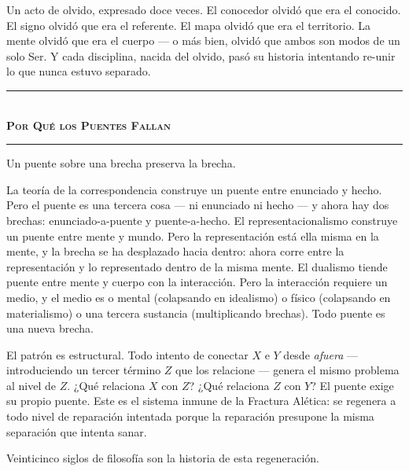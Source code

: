 \documentclass[10pt, openany, oneside]{book}
\renewcommand{\normalsize}{\fontsize{10}{13}\selectfont}
\begin{document}
Un acto de olvido, expresado doce veces. El conocedor olvidó que era el conocido. El signo olvidó que era el referente. El mapa olvidó que era el territorio. La mente olvidó que era el cuerpo --- o más bien, olvidó que ambos son modos de un solo Ser. Y cada disciplina, nacida del olvido, pasó su historia intentando re-unir lo que nunca estuvo separado.

\vspace{1.5em}


\begin{center}
    \rule{0.3\textwidth}{0.4pt}\\[0.5em]
    {\normalsize\bfseries\scshape Por Qué los Puentes Fallan}\\[0.3em]
    \rule{0.3\textwidth}{0.4pt}
\end{center}

\vspace{1em}

\noindent Un puente sobre una brecha preserva la brecha.

La teoría de la correspondencia construye un puente entre enunciado y hecho. Pero el puente es una tercera cosa --- ni enunciado ni hecho --- y ahora hay dos brechas: enunciado-a-puente y puente-a-hecho. El representacionalismo construye un puente entre mente y mundo. Pero la representación está ella misma en la mente, y la brecha se ha desplazado hacia dentro: ahora corre entre la representación y lo representado dentro de la misma mente. El dualismo tiende puente entre mente y cuerpo con la interacción. Pero la interacción requiere un medio, y el medio es o mental (colapsando en idealismo) o físico (colapsando en materialismo) o una tercera sustancia (multiplicando brechas). Todo puente es una nueva brecha.

El patrón es estructural. Todo intento de conectar $X$ e $Y$ desde \textit{afuera} --- introduciendo un tercer término $Z$ que los relacione --- genera el mismo problema al nivel de $Z$. ¿Qué relaciona $X$ con $Z$? ¿Qué relaciona $Z$ con $Y$? El puente exige su propio puente. Este es el sistema inmune de la Fractura Alética: se regenera a todo nivel de reparación intentada porque la reparación presupone la misma separación que intenta sanar.

Veinticinco siglos de filosofía son la historia de esta regeneración.
\end{document}
